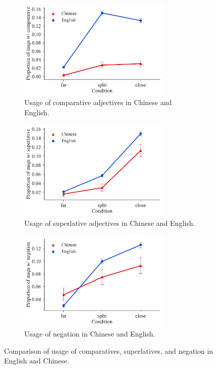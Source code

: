 \documentclass[11pt,a4paper]{article}
\renewcommand{\|}{\mid}
\begin{document}
\begin{figure}[!t]
    \centering
    \begin{subfigure}[b]{\columnwidth}
    \centering
    \includegraphics[width=0.8\textwidth]{comparative.pdf}
    \caption{Usage of comparative adjectives in Chinese and English.}
    \label{fig:comparative}
    \end{subfigure}

    \begin{subfigure}[b]{\columnwidth}
    \centering
    \includegraphics[width=0.8\textwidth]{superlative.pdf}
    \caption{Usage of superlative adjectives in Chinese and English.}
    \label{fig:superlative}
    \end{subfigure}
    
    \begin{subfigure}[b]{\columnwidth}
    \centering
    \includegraphics[width=0.8\textwidth]{negation.pdf}
    \caption{Usage of negation in Chinese and English.}
    \label{fig:negation}
    \end{subfigure}
\caption{Comparison of usage of comparatives, superlatives, and negation in English and Chinese.}
\label{fig:comp-super-neg}
\end{figure}
\end{document}
